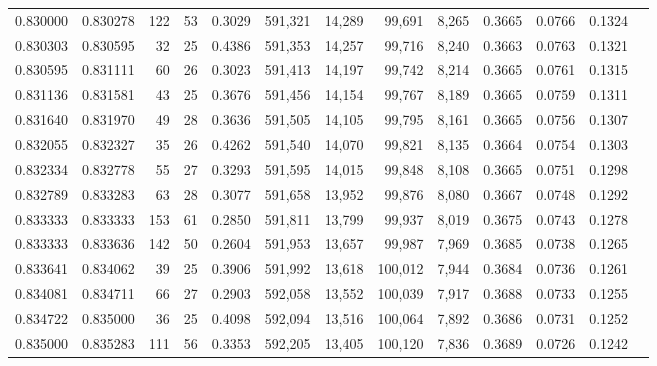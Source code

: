 \begin{tabular}{rrrrrrrrrrrrr}
0.830000 & 0.830278 &    122 &    53 &                                     0.3029 & 591,321 &  14,289 &  99,691 &   8,265 & 0.3665 & 0.0766 & 0.1324 \\
0.830303 & 0.830595 &     32 &    25 &                                     0.4386 & 591,353 &  14,257 &  99,716 &   8,240 & 0.3663 & 0.0763 & 0.1321 \\
0.830595 & 0.831111 &     60 &    26 &                                     0.3023 & 591,413 &  14,197 &  99,742 &   8,214 & 0.3665 & 0.0761 & 0.1315 \\
0.831136 & 0.831581 &     43 &    25 &                                     0.3676 & 591,456 &  14,154 &  99,767 &   8,189 & 0.3665 & 0.0759 & 0.1311 \\
0.831640 & 0.831970 &     49 &    28 &                                     0.3636 & 591,505 &  14,105 &  99,795 &   8,161 & 0.3665 & 0.0756 & 0.1307 \\
0.832055 & 0.832327 &     35 &    26 &                                     0.4262 & 591,540 &  14,070 &  99,821 &   8,135 & 0.3664 & 0.0754 & 0.1303 \\
0.832334 & 0.832778 &     55 &    27 &                                     0.3293 & 591,595 &  14,015 &  99,848 &   8,108 & 0.3665 & 0.0751 & 0.1298 \\
0.832789 & 0.833283 &     63 &    28 &                                     0.3077 & 591,658 &  13,952 &  99,876 &   8,080 & 0.3667 & 0.0748 & 0.1292 \\
0.833333 & 0.833333 &    153 &    61 &                                     0.2850 & 591,811 &  13,799 &  99,937 &   8,019 & 0.3675 & 0.0743 & 0.1278 \\
0.833333 & 0.833636 &    142 &    50 &                                     0.2604 & 591,953 &  13,657 &  99,987 &   7,969 & 0.3685 & 0.0738 & 0.1265 \\
0.833641 & 0.834062 &     39 &    25 &                                     0.3906 & 591,992 &  13,618 & 100,012 &   7,944 & 0.3684 & 0.0736 & 0.1261 \\
0.834081 & 0.834711 &     66 &    27 &                                     0.2903 & 592,058 &  13,552 & 100,039 &   7,917 & 0.3688 & 0.0733 & 0.1255 \\
0.834722 & 0.835000 &     36 &    25 &                                     0.4098 & 592,094 &  13,516 & 100,064 &   7,892 & 0.3686 & 0.0731 & 0.1252 \\
0.835000 & 0.835283 &    111 &    56 &                                     0.3353 & 592,205 &  13,405 & 100,120 &   7,836 & 0.3689 & 0.0726 & 0.1242 \\

\end{tabular}
